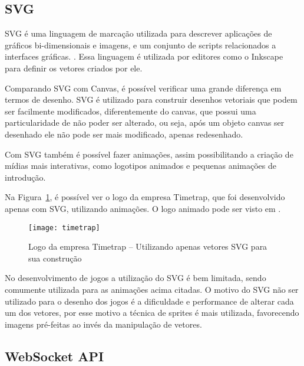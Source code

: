 \subsection{SVG}

SVG é uma linguagem de marcação utilizada para descrever aplicações de gráficos
bi-dimensionais e imagens, e um conjunto de scripts relacionados a
interfaces gráficas. \cite{website:w3csvg}. Essa linguagem é utilizada por
editores como o Inkscape para definir os vetores criados por ele.

Comparando SVG com Canvas, é possível verificar uma grande diferença
em termos de desenho. SVG é utilizado para construir desenhos
vetoriais que podem ser facilmente modificados, diferentemente do
canvas, que possui uma particularidade de não poder ser alterado, ou
seja, após um objeto canvas ser desenhado ele não pode ser mais
modificado, apenas redesenhado.

Com SVG também é possível fazer animações, assim possibilitando a
criação de mídias mais interativas, como logotipos animados e pequenas
animações de introdução.

Na Figura~\ref{img:timetrap}, é possível ver o logo da empresa
Timetrap, que foi desenvolvido apenas com SVG, utilizando animações. O
logo animado pode ser visto em .

\begin{figure}[H]
  \centering
	\texttt{[image: timetrap]}
  \caption{Logo da empresa Timetrap {--} Utilizando apenas vetores SVG para sua construção}
  \label{img:timetrap}
\end{figure}

No desenvolvimento de jogos a utilização do SVG é bem limitada, sendo
comumente utilizada para as animações acima citadas. O motivo do SVG
não ser utilizado para o desenho dos jogos é a dificuldade e
performance de alterar cada um dos vetores, por esse motivo
a técnica de sprites é mais utilizada, favorecendo imagens pré-feitas
ao invés da manipulação de vetores.


\subsection{WebSocket API}

